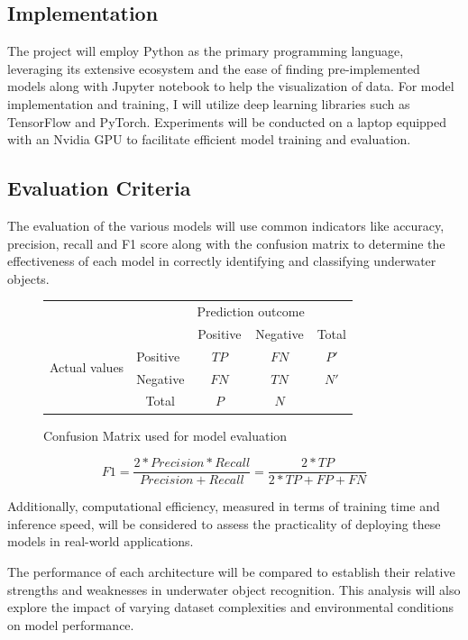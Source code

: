 \subsection{Implementation}

The project will employ Python as the primary programming language,
leveraging its extensive ecosystem and the ease of finding pre-implemented
models along with Jupyter notebook to help the visualization of data.
For model implementation and training, I will utilize deep learning
libraries such as TensorFlow and PyTorch.
Experiments will be conducted on a laptop equipped with an Nvidia GPU
to facilitate efficient model training and evaluation.

\subsection{Evaluation Criteria}

The evaluation of the various models will use common indicators like accuracy,
precision, recall and F1 score along with the confusion matrix
to determine the effectiveness of each model in correctly identifying and
classifying underwater objects.

\begin{figure}[ht]
    \begin{tabular}{l|l|c|c|c}
        \multicolumn{2}{c}{}&\multicolumn{2}{c}{Prediction outcome}&\\
        \cline{3-4}
        \multicolumn{2}{c|}{}&Positive&Negative&\multicolumn{1}{c}{Total}\\
        \cline{2-4}
        \multirow{2}{*}{Actual values}& Positive & $TP$ & $FN$ & $P'$\\
        \cline{2-4}
        & Negative & $FN$ & $TN$ & $N'$\\
        \cline{2-4}
        \multicolumn{1}{c}{} & \multicolumn{1}{c}{Total} & \multicolumn{1}{c}{$P$} & \multicolumn{    1}{c}{$N$} & \multicolumn{1}{c}{}\\
    \end{tabular}
    \caption{Confusion Matrix used for model evaluation}
    \label{Tab:confMatrix}
\end{figure}

\begin{equation}
    F1 = \frac{2*Precision*Recall}{Precision+Recall} = \frac{2*TP}{2*TP+FP+FN}
\end{equation}

Additionally, computational efficiency, measured in terms of training time
and inference speed, will be considered to assess the practicality
of deploying these models in real-world applications.

The performance of each architecture will be compared to establish
their relative strengths and weaknesses in underwater object recognition.
This analysis will also explore the impact of varying dataset complexities
and environmental conditions on model performance.

\FloatBarrier